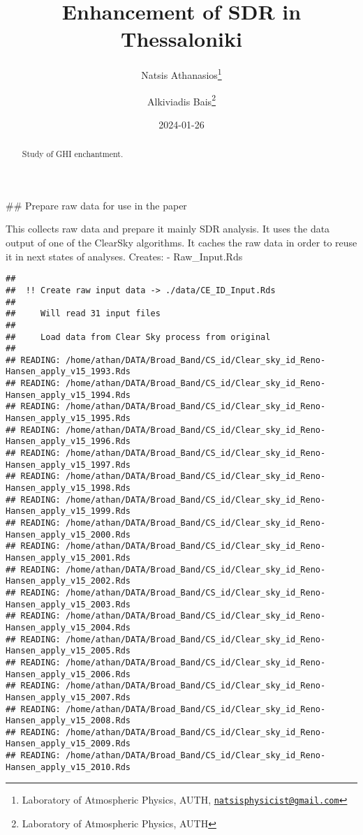 \documentclass[
  10pt,
  a4paper,oneside]{article}
\title{Enhancement of SDR in Thessaloniki}
\author{Natsis Athanasios\footnote{Laboratory of Atmospheric Physics, AUTH, \href{mailto:natsisphysicist@gmail.com}{\nolinkurl{natsisphysicist@gmail.com}}} \and Alkiviadis Bais\footnote{Laboratory of Atmospheric Physics, AUTH}}
\date{2024-01-26}
\begin{document}
\maketitle
\begin{abstract}
Study of GHI enchantment.
\end{abstract}

{
\hypersetup{linkcolor=}
\setcounter{tocdepth}{4}
\tableofcontents
}
\#\# Prepare raw data for use in the paper

This collects raw data and prepare it mainly SDR analysis.
It uses the data output of one of the ClearSky algorithms.
It caches the raw data in order to reuse it in next states of analyses.
Creates:
- Raw\_Input.Rds

\begin{verbatim}
## 
##  !! Create raw input data -> ./data/CE_ID_Input.Rds 
## 
##     Will read 31 input files
## 
##     Load data from Clear Sky process from original
## 
## READING: /home/athan/DATA/Broad_Band/CS_id/Clear_sky_id_Reno-Hansen_apply_v15_1993.Rds 
## READING: /home/athan/DATA/Broad_Band/CS_id/Clear_sky_id_Reno-Hansen_apply_v15_1994.Rds 
## READING: /home/athan/DATA/Broad_Band/CS_id/Clear_sky_id_Reno-Hansen_apply_v15_1995.Rds 
## READING: /home/athan/DATA/Broad_Band/CS_id/Clear_sky_id_Reno-Hansen_apply_v15_1996.Rds 
## READING: /home/athan/DATA/Broad_Band/CS_id/Clear_sky_id_Reno-Hansen_apply_v15_1997.Rds 
## READING: /home/athan/DATA/Broad_Band/CS_id/Clear_sky_id_Reno-Hansen_apply_v15_1998.Rds 
## READING: /home/athan/DATA/Broad_Band/CS_id/Clear_sky_id_Reno-Hansen_apply_v15_1999.Rds 
## READING: /home/athan/DATA/Broad_Band/CS_id/Clear_sky_id_Reno-Hansen_apply_v15_2000.Rds 
## READING: /home/athan/DATA/Broad_Band/CS_id/Clear_sky_id_Reno-Hansen_apply_v15_2001.Rds 
## READING: /home/athan/DATA/Broad_Band/CS_id/Clear_sky_id_Reno-Hansen_apply_v15_2002.Rds 
## READING: /home/athan/DATA/Broad_Band/CS_id/Clear_sky_id_Reno-Hansen_apply_v15_2003.Rds 
## READING: /home/athan/DATA/Broad_Band/CS_id/Clear_sky_id_Reno-Hansen_apply_v15_2004.Rds 
## READING: /home/athan/DATA/Broad_Band/CS_id/Clear_sky_id_Reno-Hansen_apply_v15_2005.Rds 
## READING: /home/athan/DATA/Broad_Band/CS_id/Clear_sky_id_Reno-Hansen_apply_v15_2006.Rds 
## READING: /home/athan/DATA/Broad_Band/CS_id/Clear_sky_id_Reno-Hansen_apply_v15_2007.Rds 
## READING: /home/athan/DATA/Broad_Band/CS_id/Clear_sky_id_Reno-Hansen_apply_v15_2008.Rds 
## READING: /home/athan/DATA/Broad_Band/CS_id/Clear_sky_id_Reno-Hansen_apply_v15_2009.Rds 
## READING: /home/athan/DATA/Broad_Band/CS_id/Clear_sky_id_Reno-Hansen_apply_v15_2010.Rds 

\end{verbatim}
\end{document}
